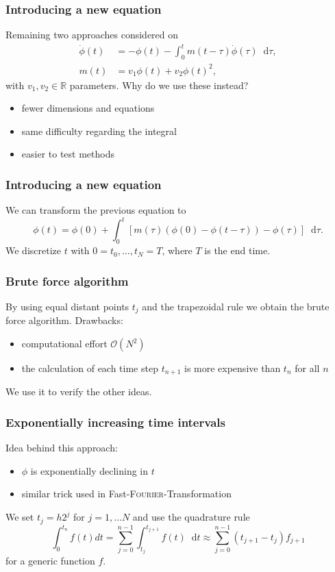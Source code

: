 \documentclass[12pt,a4paper,handout]{beamer}
\theoremstyle{definition}
\theoremstyle{plain}
\newcommand{\rr}{\mathbb{R}}
\newcommand{\D}{\mathop{}\!\mathrm{d}}
\begin{document}
\begin{frame}
    \frametitle{Introducing a new equation}
    Remaining two approaches considered on
    \begin{align*}
    \dot\phi(t)&=-\phi(t)-\int_0^tm(t-\tau)\dot\phi(\tau)\D\tau,\\
    m(t)&=v_1\phi(t)+v_2\phi(t)^2,
    \end{align*}
    with $v_1,v_2\in\rr$ parameters. Why do we use these instead?
    \begin{itemize}[<+->]
        \item fewer dimensions and equations
        \item same difficulty regarding the integral
        \item easier to test methods
    \end{itemize}
\end{frame}
\begin{frame}
    \frametitle{Introducing a new equation}
    We can transform the previous equation to 
    \begin{equation*}
        \phi(t)=\phi(0)+\int_0^t[m(\tau)(\phi(0)-\phi(t-\tau))-\phi(\tau)]\D \tau.
    \end{equation*}
    We discretize $t$ with $0=t_0,\dotsc,t_N=T$, where $T$ is the end time.
\end{frame}
\begin{frame}
    \frametitle{Brute force algorithm}
    By using equal distant points $t_j$ and the trapezoidal rule we obtain the brute force algorithm. Drawbacks:
    \begin{itemize}[<+->]
        \item computational effort $\mathcal{O}(N^2)$
        \item the calculation of each time step $t_{n+1}$ is more expensive than $t_{n}$ for all $n$
    \end{itemize}
    We use it to verify the other ideas.
\end{frame}
\begin{frame}
    \frametitle{Exponentially increasing time intervals}
    Idea behind this approach:
    \begin{itemize}[<+->]
        \item $\phi$ is exponentially declining in $t$
        \item similar trick used in Fast-\textsc{Fourier}-Transformation
    \end{itemize}
We set $t_j=h2^j$ for $j=1,\dotsc N$ and use the quadrature rule
\begin{equation*}
    \int_0^{t_n}f(t)dt=\sum_{j=0}^{n-1}\int_{t_j}^{t_{j+1}}f(t)\D t\approx\sum_{j=0}^{n-1}(t_{j+1}-t_j)f_{j+1}
\end{equation*}
for a generic function $f$.
\end{frame}
\end{document}
